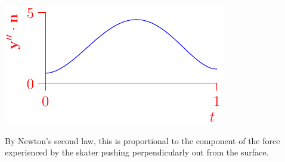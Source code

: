 \begin{example}{}{}
\begin{minipage}[t]{0.39\linewidth}
		\flushright\includegraphics{fund-skater2}
	\end{minipage}
	\medbreak
	By Newton's second law, this is proportional to the component of the force experienced by the skater pushing perpendicularly out from the surface. 
\end{example}

\goodbreak








